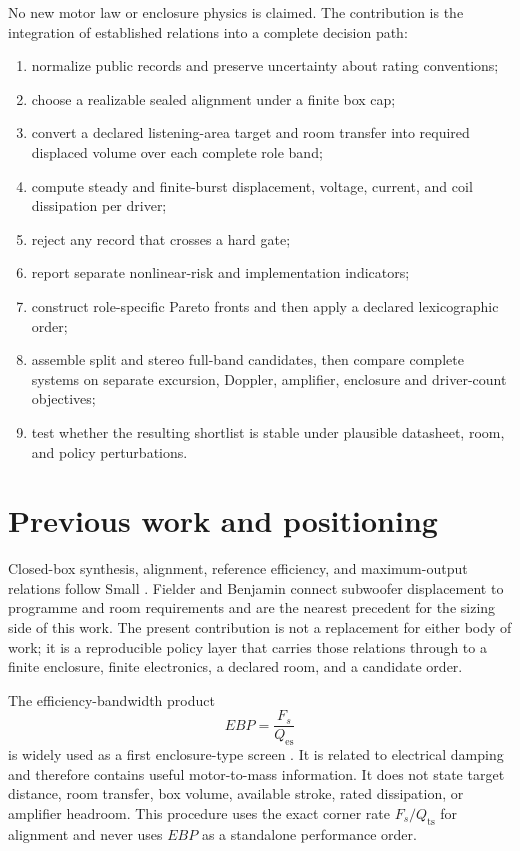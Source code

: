 \documentclass[11pt,a4paper]{article}
\numberwithin{equation}{section}
\newcommand{\Qes}{Q_{\mathrm{es}}}
\newcommand{\Qts}{Q_{\mathrm{ts}}}
\begin{document}
No new motor law or enclosure physics is claimed.  The contribution is the
integration of established relations into a complete decision path:

\begin{enumerate}
	\item normalize public records and preserve uncertainty about rating
	conventions;
	\item choose a realizable sealed alignment under a finite box cap;
	\item convert a declared listening-area target and room transfer into required
	displaced volume over each complete role band;
	\item compute steady and finite-burst displacement, voltage, current, and
	coil dissipation per driver;
	\item reject any record that crosses a hard gate;
	\item report separate nonlinear-risk and implementation indicators;
	\item construct role-specific Pareto fronts and then apply a declared
	lexicographic order;
	\item assemble split and stereo full-band candidates, then compare
	complete systems on separate excursion, Doppler, amplifier, enclosure
	and driver-count objectives;
	\item test whether the resulting shortlist is stable under plausible
	datasheet, room, and policy perturbations.
\end{enumerate}

\section{Previous work and positioning}
\label{sec:prevwork}



Closed-box synthesis, alignment, reference efficiency, and maximum-output
relations follow Small \cite{small1972,small1972direct}.  Fielder and
Benjamin \cite{fielder1988} connect subwoofer displacement to programme and
room requirements and are the nearest precedent for the sizing side of this
work.  The present contribution is not a replacement for either body of
work; it is a reproducible policy layer that carries those relations through
to a finite enclosure, finite electronics, a declared room, and a candidate
order.

The efficiency-bandwidth product
\begin{equation}
	EBP=\frac{F_s}{\Qes}
	\label{eq:ebp}
\end{equation}
is widely used as a first enclosure-type screen \cite{dickason2006}.  It is
related to electrical damping and therefore contains useful motor-to-mass
information.  It does not state target distance, room transfer, box volume,
available stroke, rated dissipation, or amplifier headroom.  This procedure
uses the exact corner rate $F_s/\Qts$ for alignment and never uses $EBP$ as a
standalone performance order.
\end{document}
